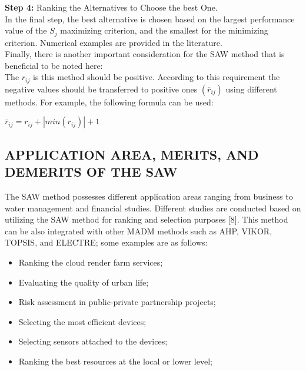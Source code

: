 \documentclass[12pt,a4paper]{article}
\begin{document}
\textbf{Step 4:} Ranking the Alternatives to Choose the
best One.\\

In the final step, the best alternative is chosen based on the largest performance value of the $S_{j}$ maximizing criterion, and the smallest for the minimizing criterion. Numerical examples are provided in the literature.\\

Finally, there is another important consideration for the SAW method that is beneficial to be noted
here:\\

The $r_{ij}$ is this method should be positive. According to this requirement the negative values should be transferred to positive ones $(\overline r_{ij})$ using different methods. For example, the following formula can be used:
\begin{center}

   $\overline r_{ij} = r_{ij} + |{min (r_{ij})}|+1$
    
\end{center}

\subsection{APPLICATION AREA, MERITS, AND DEMERITS OF THE SAW}
\hspace{1em}The SAW method possesses different application
areas ranging from business to water management and financial studies. Different studies are conducted based on utilizing the SAW method for ranking and selection purposes [8]. This method can be also integrated with other MADM methods such as AHP, VIKOR, TOPSIS, and ELECTRE; some examples are as follows:
\begin{itemize}
    \item Ranking the cloud render farm services;

    \item Evaluating the quality of urban life;

    \item Risk assessment in public-private partnership projects;

    \item Selecting the most efficient devices;

    \item Selecting sensors attached to the devices;

    \item Ranking the best resources at the local or lower level;


\end{itemize}
\end{document}
